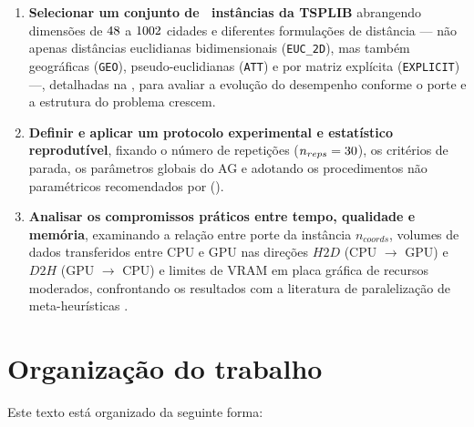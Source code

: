 \begin{enumerate}
            Na literatura computacional, o adjetivo \emph{naive} (ingênuo) designa implementações diretas que ainda não exploram otimizações de agrupamento ou permanência em memória.
      \item
            \textbf{Selecionar um conjunto de \totalinstancias\ instâncias da TSPLIB} abrangendo dimensões de \(48\) a \(1002\) cidades e diferentes formulações de distância --- não apenas distâncias euclidianas bidimensionais (\texttt{EUC\_2D}), mas também geográficas (\texttt{GEO}), pseudo-euclidianas (\texttt{ATT}) e por matriz explícita (\texttt{EXPLICIT}) ---, detalhadas na , para avaliar a evolução do desempenho conforme o porte e a estrutura do problema crescem.
      \item
            \textbf{Definir e aplicar um protocolo experimental e estatístico reprodutível}, fixando o número de repetições (\(n_{reps} = 30\)), os critérios de parada, os parâmetros globais do AG e adotando os procedimentos não paramétricos recomendados por \textcite{demsar2006statistical} ().
      \item
            \textbf{Analisar os compromissos práticos entre tempo, qualidade e memória}, examinando a relação entre porte da instância \(n_{coords}\), volumes de dados transferidos entre CPU e GPU nas direções \(\mathit{H2D}\) (CPU \(\to\) GPU) e \(\mathit{D2H}\) (GPU \(\to\) CPU) e limites de VRAM em placa gráfica de recursos moderados, confrontando os resultados com a literatura de paralelização de meta-heurísticas \autocite{crainic2003parallel,alba2005parallel,schulz2013gpu,tsp_gpu,fujimoto2011highly}.
\end{enumerate}

\section{Organização do trabalho}\label{sec-16-organizacao}

Este texto está organizado da seguinte forma:

